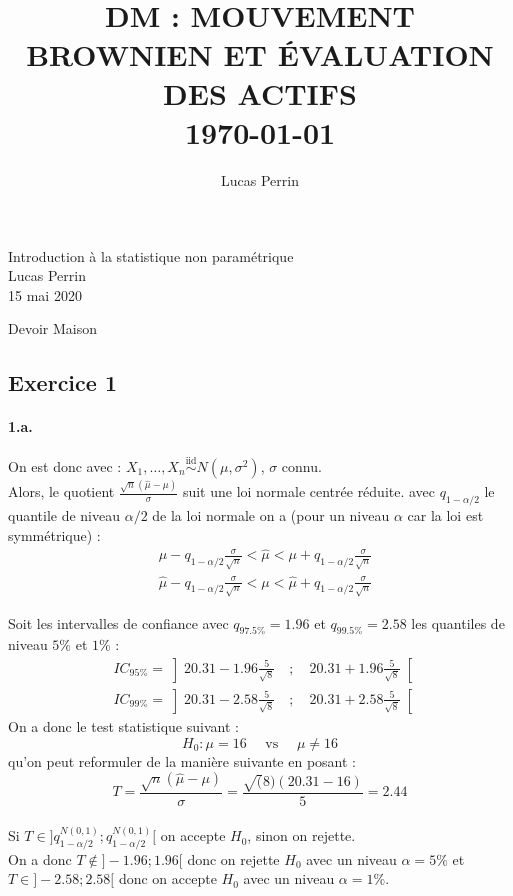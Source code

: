 \documentclass[a4paper,10pt]{report}
\title{ \normalsize \textsc{}    %
            \\[2.0cm]                               %
            \HRule{0.5pt} \\                        %
            \LARGE \textbf{\uppercase{DM : Mouvement Brownien et évaluation des actifs}}    %
            \HRule{2pt} \\ [0.5cm]      %
            \normalsize \today        %
            \\
        }
\author{
       Lucas Perrin\\
}
\begin{document}
\setcounter{page}{1}
\noindent
Introduction à la statistique non paramétrique\\
Lucas Perrin\\
15 mai 2020

\begin{center}
\huge{ Devoir Maison }
\end{center}


\subsection*{Exercice 1}


\paragraph{1.a.}  On est donc avec : $X_{1}, \ldots, X_{n} \stackrel{\text {iid}}{\sim} N\left(\mu, \sigma^{2}\right)$, $\sigma$ connu.\\
Alors, le quotient $\frac{\sqrt{n}(\hat{\mu}-\mu)}{\sigma}$ suit une loi normale centrée réduite. avec $q_{1-\alpha /2}$ le quantile de niveau $\alpha/2$ de la loi normale on a (pour un niveau $\alpha$ car la loi est symmétrique)  :
$$
\begin{aligned}
& \mu-q_{1-\alpha /2} \frac{\sigma}{\sqrt{n}}<\hat{\mu}<\mu+q_{1-\alpha /2} \frac{\sigma}{\sqrt{n}} \\
& \hat{\mu}-q_{1-\alpha /2} \frac{\sigma}{\sqrt{n}}<\mu<\hat{\mu}+q_{1-\alpha /2} \frac{\sigma}{\sqrt{n}}
\end{aligned}
$$

Soit les intervalles de confiance avec $q_{97.5\%} = 1.96$ et $q_{99.5\%} = 2.58$ les quantiles de niveau $5\%$ et $1\%$ :
$$
\begin{aligned}
& IC_{95\%} = \left] 20.31 - 1.96 \frac{5}{\sqrt{8}} \quad ; \quad 20.31 + 1.96 \frac{5}{\sqrt{8}} \right[ \\
& IC_{99\%} = \left] 20.31 - 2.58 \frac{5}{\sqrt{8}} \quad ; \quad 20.31 + 2.58 \frac{5}{\sqrt{8}} \right[
\end{aligned}
$$
On a donc le test statistique suivant :
$$
H_{0}: \mu=16 \quad \text { vs } \quad \mu \neq 16
$$
qu'on peut reformuler de la manière suivante en posant :
$$
T = \frac{\sqrt{n}(\hat{\mu}-\mu)}{\sigma} = \frac{\sqrt(8)(20.31 - 16)}{5} = 2.44
$$\\
Si $T \in ] q_{1-\alpha /2}^{N(0,1)} ; q_{1-\alpha /2}^{N(0,1)}[$ on accepte $H_0$, sinon on rejette. \\
\newline
On a donc $T \notin ]-1.96;1.96[$ donc on rejette $H_0$ avec un niveau $\alpha = 5\%$ et $T \in ]-2.58;2.58[$ donc on accepte $H_0$ avec un niveau $\alpha = 1\%$.
\end{document}
